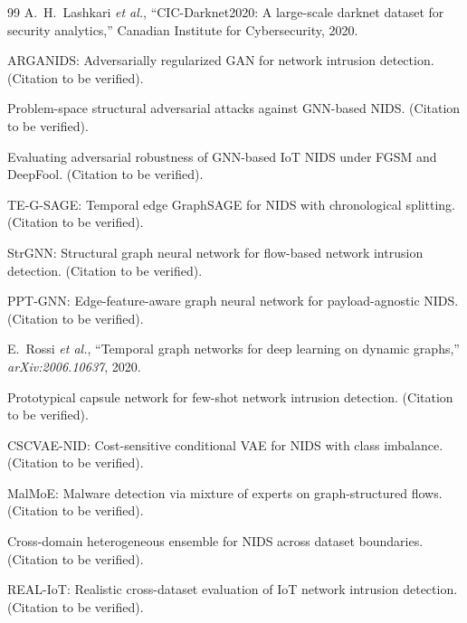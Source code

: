 \documentclass[compsoc,journal]{IEEEtran}
\begin{document}
\begin{thebibliography}{99}
A.~H.~Lashkari \emph{et al.},
``CIC-Darknet2020: A large-scale darknet dataset for security analytics,''
Canadian Institute for Cybersecurity, 2020.

ARGANIDS: Adversarially regularized GAN for network intrusion detection.
(Citation to be verified).

Problem-space structural adversarial attacks against GNN-based NIDS.
(Citation to be verified).

Evaluating adversarial robustness of GNN-based IoT NIDS under FGSM and DeepFool.
(Citation to be verified).

TE-G-SAGE: Temporal edge GraphSAGE for NIDS with chronological splitting.
(Citation to be verified).

StrGNN: Structural graph neural network for flow-based network intrusion detection.
(Citation to be verified).

PPT-GNN: Edge-feature-aware graph neural network for payload-agnostic NIDS.
(Citation to be verified).

E.~Rossi \emph{et al.},
``Temporal graph networks for deep learning on dynamic graphs,''
\emph{arXiv:2006.10637}, 2020.

Prototypical capsule network for few-shot network intrusion detection.
(Citation to be verified).

CSCVAE-NID: Cost-sensitive conditional VAE for NIDS with class imbalance.
(Citation to be verified).

MalMoE: Malware detection via mixture of experts on graph-structured flows.
(Citation to be verified).

Cross-domain heterogeneous ensemble for NIDS across dataset boundaries.
(Citation to be verified).

REAL-IoT: Realistic cross-dataset evaluation of IoT network intrusion detection.
(Citation to be verified).

\end{thebibliography}


\end{document}
